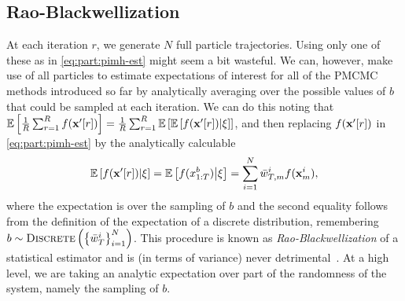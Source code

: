 \subsection{Rao-Blackwellization}
\label{sec:part:pmcmc:all}

At each \mcmc iteration $r$, we generate $N$ full particle trajectories. 
Using only one of these as in \eqref{eq:part:pimh-est} might seem a bit wasteful. 
We can, however, make use of all particles to estimate expectations of interest for all
of the PMCMC methods introduced so far by analytically averaging over the possible
values of $b$ that could be sampled at each iteration. 
We can do this noting that $\mathbb{E}\left[\frac{1}{R} \sum_{r=1}^{R} f(\mathbf{x}'[r]) \right]
= \frac{1}{R} \sum_{r=1}^{R} \mathbb{E}\left[\mathbb{E}\left[ f(\mathbf{x}'[r]) \middle| \mathbf{\xi}\right]\right]$,
and then replacing $f(\mathbf{x}'[r])$ in \eqref{eq:part:pimh-est}  by the analytically calculable
\begin{align}
\label{eq:part:rao-pg}
\mathbb{E}\left[f(\mathbf{x}'[r]) \middle| \mathbf{\xi} \right] = \mathbb{E}\left[f(x_{1:T}^b) \middle| \mathbf{\xi} \right]
= \sum_{i=1}^N \bar w_{T,m}^i f(\mathbf{x}_{m}^i),
\end{align}
where the expectation is over the sampling of $b$ and  the second equality follows 
from the definition of the expectation of a discrete distribution,
remembering $b \sim \operatorname*{\textsc{Discrete}}\left(\left\{\bar w_{T}^i\right\}_{i=1}^N\right)$.
This procedure is known as \emph{Rao-Blackwellization} of a statistical estimator and is (in terms of variance) 
never detrimental~\citep{casella1996rao}.  At a high level, we are taking an analytic expectation over part of
the randomness of the system, namely the sampling of $b$.



